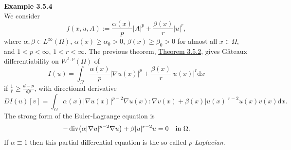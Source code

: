 \textbf{Example 3.5.4}\\
We consider
\[f(x,u,A):=\frac{\alpha(x)}{p}\lvert A\rvert^p+\frac{\beta(x)}{r}\lvert u\rvert^r,\]
where $\alpha,\beta\in L^\infty(\Omega)$, $\alpha(x)\geq\alpha_0>0$, $\beta(x)\geq\beta_0>0$ for almost all $x\in\Omega$, and $1<p<\infty$, $1<r<\infty$. The previous theorem, \hyperlink{theorem_3_5_2}{Theorem 3.5.2}, gives G\^ateaux differentiability on $W^{1,p}(\Omega)$ of
\[I(u)=\int_\Omega{\frac{\alpha(x)}{p}\lvert\nabla u(x)\rvert^p+\frac{\beta(x)}{r}\lvert u(x)\rvert^r\mathrm{d}x}\]
if $\frac{1}{r}\geq\frac{d-p}{dp}$, with directional derivative
\[DI(u)[v]=\int_\Omega{\alpha(x)\lvert\nabla u(x)\rvert^{p-2}\nabla u(x):\nabla v(x)+\beta(x)\lvert u(x)\rvert^{r-2}u(x)v(x)\mathrm{d}x}.\]
The strong form of the Euler-Lagrange equation is
\[-\operatorname{div}\mathopen{}\left(\alpha\lvert\nabla u\rvert^{p-2}\nabla u\right)\mathclose{}+\beta\lvert u\rvert^{r-2}u=0\quad\text{in }\Omega.\]
If $\alpha\equiv1$ then this partial differential equation is the so-called \textit{$p$-Laplacian}.